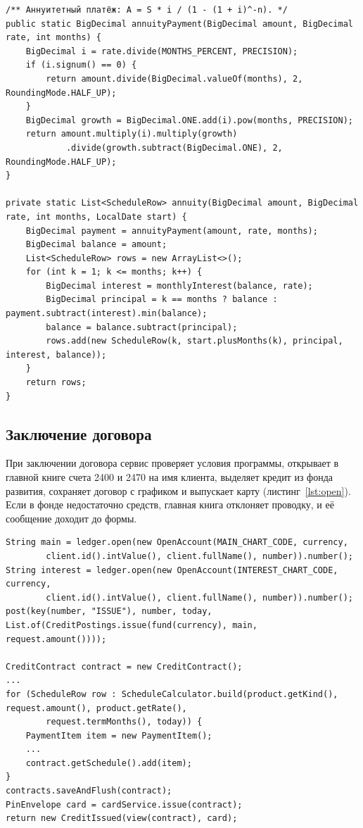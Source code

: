 \documentclass[14pt,a4paper]{extarticle}
\begin{document}
\begin{lstlisting}[style=java, caption={Аннуитетный график (\texttt{ScheduleCalculator})}, label={lst:schedule}]
/** Аннуитетный платёж: A = S * i / (1 - (1 + i)^-n). */
public static BigDecimal annuityPayment(BigDecimal amount, BigDecimal rate, int months) {
    BigDecimal i = rate.divide(MONTHS_PERCENT, PRECISION);
    if (i.signum() == 0) {
        return amount.divide(BigDecimal.valueOf(months), 2, RoundingMode.HALF_UP);
    }
    BigDecimal growth = BigDecimal.ONE.add(i).pow(months, PRECISION);
    return amount.multiply(i).multiply(growth)
            .divide(growth.subtract(BigDecimal.ONE), 2, RoundingMode.HALF_UP);
}

private static List<ScheduleRow> annuity(BigDecimal amount, BigDecimal rate, int months, LocalDate start) {
    BigDecimal payment = annuityPayment(amount, rate, months);
    BigDecimal balance = amount;
    List<ScheduleRow> rows = new ArrayList<>();
    for (int k = 1; k <= months; k++) {
        BigDecimal interest = monthlyInterest(balance, rate);
        BigDecimal principal = k == months ? balance : payment.subtract(interest).min(balance);
        balance = balance.subtract(principal);
        rows.add(new ScheduleRow(k, start.plusMonths(k), principal, interest, balance));
    }
    return rows;
}
\end{lstlisting}

\subsection{Заключение договора}

При заключении договора сервис проверяет условия программы, открывает в главной книге
счета 2400 и 2470 на имя клиента, выделяет кредит из фонда развития, сохраняет договор с
графиком и выпускает карту (листинг~\ref{lst:open}). Если в фонде недостаточно средств,
главная книга отклоняет проводку, и её сообщение доходит до формы.

\begin{lstlisting}[style=java, caption={Счета, выделение кредита, график и карта (\texttt{CreditService.open})}, label={lst:open}]
String main = ledger.open(new OpenAccount(MAIN_CHART_CODE, currency,
        client.id().intValue(), client.fullName(), number)).number();
String interest = ledger.open(new OpenAccount(INTEREST_CHART_CODE, currency,
        client.id().intValue(), client.fullName(), number)).number();
post(key(number, "ISSUE"), number, today, List.of(CreditPostings.issue(fund(currency), main, request.amount())));

CreditContract contract = new CreditContract();
...
for (ScheduleRow row : ScheduleCalculator.build(product.getKind(), request.amount(), product.getRate(),
        request.termMonths(), today)) {
    PaymentItem item = new PaymentItem();
    ...
    contract.getSchedule().add(item);
}
contracts.saveAndFlush(contract);
PinEnvelope card = cardService.issue(contract);
return new CreditIssued(view(contract), card);
\end{lstlisting}
\end{document}
